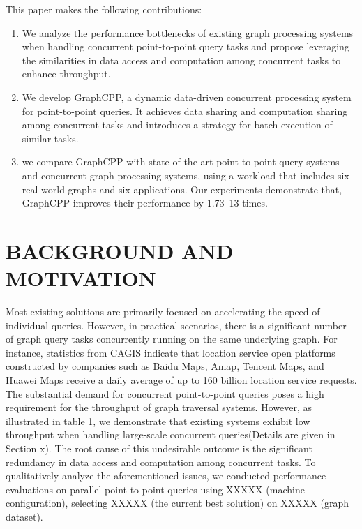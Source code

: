 \documentclass[lettersize,journal]{IEEEtran} %
\begin{document}
This paper makes the following contributions:
\begin{enumerate}
  \item{We analyze the performance bottlenecks of existing graph processing systems when handling concurrent point-to-point query tasks and propose leveraging the similarities in data access and computation among concurrent tasks to enhance throughput.}
  \item{We develop GraphCPP, a dynamic data-driven concurrent processing system for point-to-point queries. It achieves data sharing and computation sharing among concurrent tasks and introduces a strategy for batch execution of similar tasks.}
  \item{we compare GraphCPP with state-of-the-art point-to-point query systems and concurrent graph processing systems, using a workload that includes six real-world graphs\cite{snap}\cite{twitter}\cite{bubing}\cite{timeaware} and six applications\cite{ppsp_1}\cite{ppwp}\cite{ppnp}\cite{bfs}\cite{reachability_1}\cite{connectivity}. Our experiments demonstrate that, GraphCPP improves their performance by 1.73~13 times.}
\end{enumerate}

\section{BACKGROUND AND MOTIVATION}
Most existing solutions\cite{pnp}\cite{tripoline}\cite{sgraph} are primarily focused on accelerating the speed of individual queries. However, in practical scenarios, there is a significant number of graph query tasks concurrently running on the same underlying graph. For instance, statistics from CAGIS\cite{cagis} indicate that location service open platforms constructed by companies such as Baidu Maps\cite{baidu}, Amap\cite{amap}, Tencent Maps\cite{qq}, and Huawei Maps\cite{petalmaps} receive a daily average of up to 160 billion location service requests. The substantial demand for concurrent point-to-point queries poses a high requirement for the throughput of graph traversal systems. However, as illustrated in table 1, we demonstrate that existing systems exhibit low throughput when handling large-scale concurrent queries(Details are given in Section x). The root cause of this undesirable outcome is the significant redundancy in data access and computation among concurrent tasks. To qualitatively analyze the aforementioned issues, we conducted performance evaluations on parallel point-to-point queries using XXXXX (machine configuration), selecting XXXXX (the current best solution) on XXXXX (graph dataset).
\end{document}
